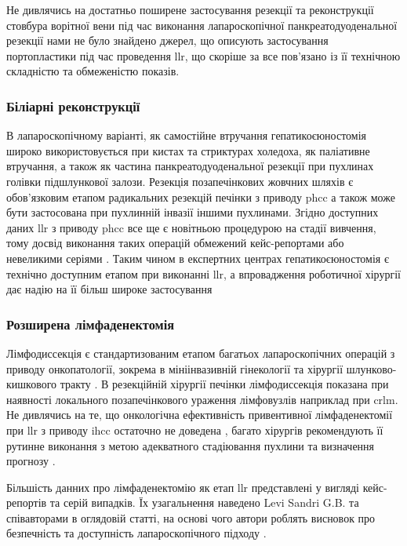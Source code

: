 \begin{refsection}
Не дивлячись на достатньо поширене застосування резекції та реконструкції стовбура ворітної вени під час виконання лапароскопічної панкреатодуоденальної резекції \cite{Kendrick2011, Garbarino2018, Wei2019} нами не було знайдено джерел, що описують застосування портопластики під час проведення \acrshort{llr}, що скоріше за все пов'язано із її технічною складністю та обмеженістю показів. 

\subsubsection{Біліарні реконструкції}

В лапароскопічному варіанті, як самостійне втручання гепатикоєюностомія широко використовується при кистах та стриктурах холедоха, як паліативне втручання, а також як частина панкреатодуоденальної резекції при пухлинах голівки підшлункової залози. Резекція позапечінкових жовчних шляхів є обов'язковим етапом радикальних резекцій печінки з приводу \acrshort{phcc} а також може бути застосована при пухлинній інвазії іншими пухлинами. Згідно доступних даних \acrshort{llr} з приводу  \acrshort{phcc} все ще є новітньою процедурою на стадії вивчення, тому досвід виконання таких операцій обмежений кейс-репортами \cite{Lin2014, Machado2014} або невеликими серіями \cite{Ratti2020}. Таким чином в експертних центрах гепатикоєюностомія є технічно доступним етапом при виконанні \acrshort{llr}, а впровадження роботичної хірургії дає надію на її більш широке застосування \cite{Machado2019, Giulianotti2010}

\subsubsection{Розширена лімфаденектомія}

Лімфодиссекція є стандартизованим етапом багатьох лапароскопічних операцій з приводу онкопатології, зокрема в мініінвазивній гінекології та хірургії шлунково-кишкового тракту \cite{Eshuis2018, Jung2019}. В резекційній хірургії печінки лімфодиссекція показана при наявності локального позапечінкового ураження лімфовузлів наприклад при \acrshort{crlm}. Не дивлячись на те, що  онкологічна ефективність привентивної лімфаденектомії при \acrshort{llr} з приводу \acrshort{ihcc} остаточно не доведена \cite{Weber2015, Zhou2019a}, багато хірургів рекомендують її рутинне виконання з метою адекватного стадіювання пухлини та визначення прогнозу \cite{Waisberg2018, Ratti2020a}.

Більшість данних про лімфаденектомію як етап \acrshort{llr} представлені у вигляді кейс-репортів та серій випадків. Їх узагальнення  наведено Levi Sandri G.B. та співавторами в оглядовій статті, на основі чого автори роблять висновок про безпечність та доступність лапароскопічного підходу \cite{Colasanti2017}. 


\end{refsection}
